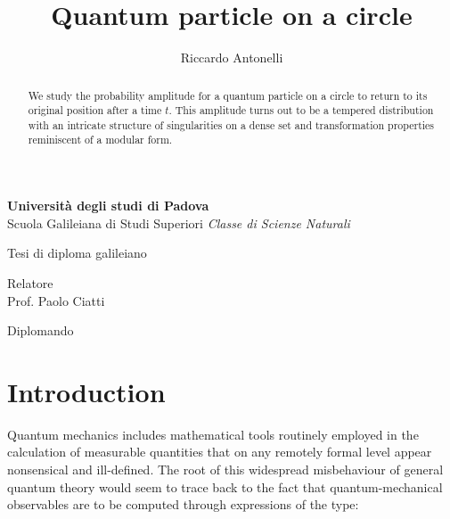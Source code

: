 \documentclass{article}
\title{Quantum particle on a circle}
\author{Riccardo Antonelli}
\begin{document}
\makeatletter
\begin{center} \Large
    \vfill
    {\LARGE \textbf{Universit\`a degli studi di Padova}}\\
    \vspace{30pt}
    Scuola Galileiana di Studi Superiori \vfill
    \emph{Classe di Scienze Naturali}\\ \vfill

    Tesi di diploma galileiano\\ \vfill

    {\Huge \bfseries \@title }
    \vfill

\end{center}

\vspace{100pt}

\begin{multicols}{2} \Large
    \begin{flushleft}
    Relatore\\
    Prof. Paolo Ciatti
\end{flushleft}

    \columnbreak

    \begin{flushright}
    Diplomando\\
    \@author
\end{flushright}

\end{multicols}

\vfill


\newpage

\maketitle

\begin{abstract}
    We study the probability amplitude for a quantum particle on a circle to return to its original position after a time $t$. This amplitude turns out to be a tempered distribution with an intricate structure of singularities on a dense set and transformation properties reminiscent of a modular form.
\end{abstract}

\tableofcontents

\section{Introduction}

Quantum mechanics includes mathematical tools routinely employed in the calculation of measurable quantities that on any remotely formal level appear nonsensical and ill-defined. The root of this widespread misbehaviour of general quantum theory would seem to trace back to the fact that quantum-mechanical observables are to be computed through expressions of the type:
\end{document}
